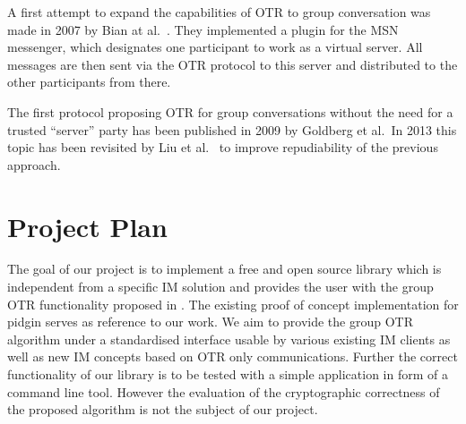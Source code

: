 A first attempt to expand the capabilities of OTR to group conversation was made in 2007 by Bian at al.\ \cite{gotr}. They implemented a plugin for the MSN messenger, which designates one participant to work as a virtual server. All messages are then sent via the OTR protocol to this server and distributed to the other participants from there.

The first protocol proposing OTR for group conversations without the need for a
trusted “server” party \cite{mp-otr} has been published in 2009 by Goldberg et
al.\ In 2013 this topic has been revisited by Liu et al.\ \cite{impr-gotr} to
improve repudiability of the previous approach.

\section{Project Plan}

The goal of our project is to implement a free and open source library which is
independent from a specific IM solution and provides the user with the group OTR
functionality proposed in \cite{impr-gotr}. The existing proof of concept
implementation for pidgin serves as reference to our work. We aim to provide the
group OTR algorithm under a standardised interface usable by various existing IM
clients as well as new IM concepts based on OTR only communications. Further the
correct functionality of our library is to be tested with a simple application in form of a command line tool.
However the evaluation of the cryptographic correctness of the proposed
algorithm is not the subject of our project.

